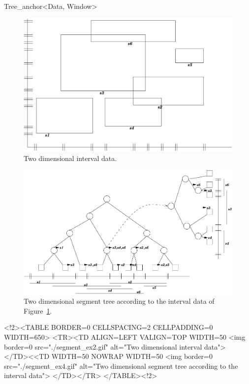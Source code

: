 \begin{ccClassTemplate}{Tree_anchor<Data, Window>}
\begin{ccTexOnly}
\begin{figure}[htbp]
    \begin{center}
    \includegraphics[width=12cm,clip]{SearchStructures/segment_ex2}
    \end{center}
\caption{\label{fig:rectangles}Two dimensional interval data.}
\end{figure}
\begin{figure}[htbp]
    \begin{center}
    \includegraphics[width=12cm,clip]{SearchStructures/segment_ex4}
    \end{center}
\caption{\label{fig:segTreeEx}\protect Two dimensional segment tree
  according to the interval data of Figure~\ref{fig:rectangles}.}
\end{figure}
\end{ccTexOnly}
\begin{ccHtmlOnly}
        <!2><TABLE BORDER=0 CELLSPACING=2 CELLPADDING=0 WIDTH=650>
        <TR><TD ALIGN=LEFT VALIGN=TOP WIDTH=50%
  <img border=0 src="./segment_ex2.gif" alt="Two
    dimensional interval data">
 </TD><<TD WIDTH=50%
                           NOWRAP WIDTH=50%
 <img border=0 src="./segment_ex4.gif" alt="Two
    dimensional segment tree according to the interval data"> </TD></TR>
        </TABLE><!2>


\end{ccHtmlOnly}
\end{ccClassTemplate}
